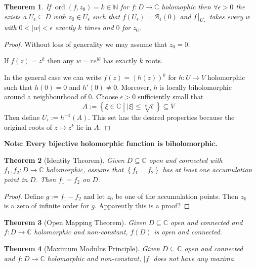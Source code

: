 \documentclass[11pt]{article}
\newcommand{\defeq}{:=}
\newcommand{\abs}[1]{|#1|}
\DeclareMathOperator{\ord}{\text{ord}}
\newcommand{\relmiddle}[1]{\mathrel{}\middle#1\mathrel{}}
\newcommand{\rmv}{\relmiddle|}
\newcommand\restr[2]{{%
  \left.\kern-\nulldelimiterspace %
  #1 %
  \vphantom{\big|} %
  \right|_{#2} %
  }}
\newcommand{\C}{\mathbb{C}}
\newcommand{\N}{\mathbb{N}}
\newenvironment{note}
	{\begin{mdframed}[backgroundcolor=white, linecolor=red, roundcorner=5pt, linewidth=1pt]\bfseries{Note:}\normalfont}
	{\end{mdframed}}
\newtheorem{theorem}{Theorem}[section]
\begin{document}
\begin{theorem}
If $\ord(f, z_0)=k\in\N$ for $f:D\to\C$ holomophic then $\forall\epsilon >0$ the exists a $U_\epsilon\subseteq D$ with $z_0\in U_\epsilon$ such that $f(U_\epsilon)=\mathcal{B}_\epsilon(0)$ and $\restr{f}{U_\epsilon}$ takes every $w$ with $0<\abs{w}<\epsilon$ exactly $k$ times and $0$ for $z_0$.
\end{theorem}

\begin{proof}
Without loss of generality we may assume that $z_0=0$.

If $f(z)=z^k$ then any $w=re^{i\theta}$ has exactly $k$ roots.

In the general case we can write $f(z)=(h(z))^k$ for $h:U\to V$ holomorphic such that $h(0)=0$ and $h'(0)\neq 0$.
Moreover, $h$ is locally biholomorphic around a neighbourhood of $0$.
Choose $\epsilon>0$ sufficiently small that
\[
	A\defeq\left\{\xi\in\C \rmv \abs{\xi}\leq\sqrt[k]{\epsilon}\right\}\subseteq V
\]
Then define $U_\epsilon\defeq h^{-1}(A)$.
This set has the desired properties because the original roots of $z\mapsto z^k$ lie in $A$.
\end{proof}

\begin{note}
Every bijective holomorphic function is biholomorphic.
\end{note}

\begin{theorem}[Identity Theorem]
Given $D\subseteq\C$ open and connected with $f_1, f_2:D\to\C$ holomorphic, assume that $\left\{f_1=f_2\right\}$ has at least one accumulation point in $D$.
Then $f_1=f_2$ on $D$.
\end{theorem}

\begin{proof}
Define $g\defeq f_1 - f_2$ and let $z_0$ be one of the accumulation points.
Then $z_0$ is a zero of infinite order for $g$.
Apparently this is a proof?
\end{proof}

\begin{theorem}[Open Mapping Theorem]
Given $D\subseteq\C$ open and connected and $f:D\to\C$ holomorphic and non-constant, $f(D)$ is open and connected.
\end{theorem}

\begin{theorem}[Maximum Modulus Principle]
Given $D\subseteq\C$ open and connected and $f:D\to\C$ holomorphic and non-constant, $\abs{f}$ does not have any maxima.
\end{theorem}
\end{document}
